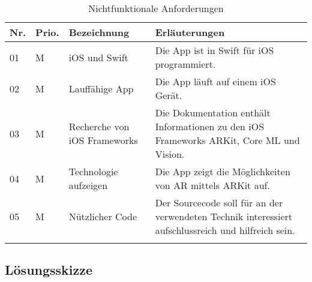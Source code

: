 \begin{longtable}{l l p{4.7cm} p{8cm}}
	\hline
	\textbf{Nr.} & \textbf{Prio.} & \textbf{Bezeichnung} & \textbf{Erläuterungen} \\
	\hline
	01 & M & iOS und Swift & Die App ist in Swift für iOS programmiert. \\
	02 & M & Lauffähige App & Die App läuft auf einem iOS Gerät. \\
	03 & M & Recherche von iOS Frameworks & Die Dokumentation enthält Informationen zu den iOS Frameworks ARKit, Core ML und Vision. \\
	04 & M & Technologie aufzeigen & Die App zeigt die Möglichkeiten von AR mittels ARKit auf. \\
	05 & M & Nützlicher Code & Der Sourcecode soll für an der verwendeten Technik interessiert aufschlussreich und hilfreich sein. \\
	\hline
	\caption{Nichtfunktionale Anforderungen}
	\label{tab:nichtfunktionale-anforderungen}
\end{longtable}

\subsection{Lösungsskizze}
